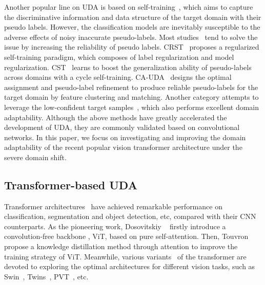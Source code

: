 \documentclass[journal]{IEEEtran}
\begin{document}
Another popular line on UDA is based on self-training~\cite{saito2017asymmetric,french2017self,zou2018unsupervisedCBST, xie2018learning, zou2019confidenceCRST, gu2020spherical, mei2020instance, liu2021cycle, na2021fixbi, zhang2022udaCAUDA, zhang2022low}, which aims to capture the discriminative information and data structure of the target domain with their pseudo labels. However, the classification models are inevitably susceptible to the adverse effects of noisy inaccurate pseudo-labels. Most studies~\cite{zou2018unsupervisedCBST, zou2019confidenceCRST, liu2021cycle, gu2020spherical, zhang2022udaCAUDA} tend to solve the issue by increasing the reliability of pseudo labels. CRST~\cite{zou2019confidenceCRST} proposes a  regularized self-training paradigm, which composes of label regularization and model regularization. CST~\cite{liu2021cycle} learns to boost the generalization ability of pseudo-labels across domains with a cycle self-training. CA-UDA~\cite{zhang2022udaCAUDA} designs the optimal assignment and pseudo-label refinement to produce reliable pseudo-labels for the target domain by feature clustering and matching. Another category  attempts to leverage the low-confident target samples~\cite{zhang2022low,na2021fixbi}, which also performs excellent domain adaptability.  
Although the above methods have greatly accelerated the development of UDA, they are commonly validated based on convolutional networks.  In this paper, we focus on investigating and improving the domain adaptability of the recent popular vision transformer architecture under the severe domain shift.   





\subsection{Transformer-based UDA}
Transformer architectures~\cite{
carion2020endDETR,
zhu2020deformable,
zheng2021rethinking,
cheng2022masked,
li2022exploring} have achieved remarkable performance on classification, segmentation and object detection, etc, compared with their CNN counterparts. As the pioneering work, Dosovitskiy \etal ~\cite{dosovitskiy2020imageViT} firstly introduce a convolution-free backbone \ieno, ViT, based on pure self-attention. Then, Touvron \etal \cite{touvron2021trainingDEiT} propose a knowledge distillation method through attention to improve the training strategy of ViT. Meanwhile, various variants~\cite{liu2021Swin, wang2021pyramidPVT, chu2021twinsTwins} of the transformer are devoted to exploring the optimal architectures for different vision tasks, such as Swin~\cite{liu2021Swin}, Twins~\cite{chu2021twinsTwins}, PVT~\cite{wang2021pyramidPVT}, etc.  
\end{document}
